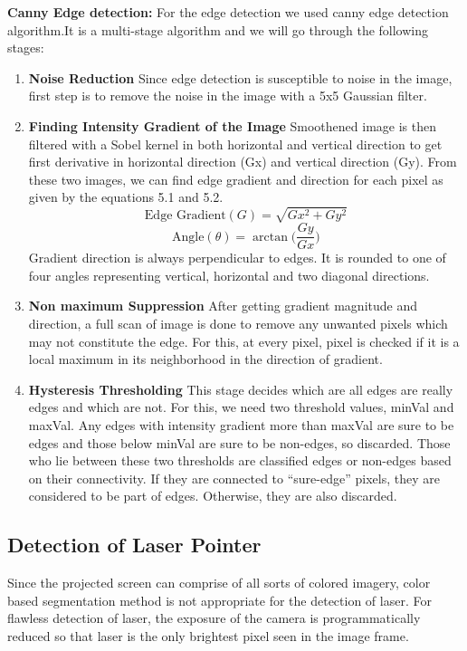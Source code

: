 \documentclass[12pt, a4paper]{article}
\begin{document}
\textbf{Canny Edge detection:}
For the edge detection we used canny edge detection algorithm.It is a multi-stage algorithm and we will go through the following stages:
\begin{enumerate}
\item \textbf {Noise Reduction}
Since edge detection is susceptible to noise in the image, first step is to remove the noise in the image with a 5x5 Gaussian filter.

\item \textbf{Finding Intensity Gradient of the Image}
Smoothened image is then filtered with a Sobel kernel in both horizontal and vertical direction to get first derivative in horizontal direction (Gx) and vertical direction (Gy). From these two images, we can find edge gradient and direction for each pixel as given by the equations 5.1 and 5.2.
\begin{equation}
\text{Edge Gradient}(G) = \sqrt{Gx^2 + Gy^2}
\end{equation}
\begin{equation}
\text{Angle}(\theta) = \arctan\bigg(\frac{Gy}{Gx}\bigg)
\end{equation}
Gradient direction is always perpendicular to edges. It is rounded to one of four angles   representing vertical, horizontal and two diagonal directions.
\item \textbf{Non maximum Suppression}
After getting gradient magnitude and direction, a full scan of image is done to remove any unwanted pixels which may not constitute the edge. For this, at every pixel, pixel is checked ­if it is a local maximum in its neighborhood in the direction of gradient.

\item \textbf{Hysteresis Thresholding}
This stage decides which are all edges are really edges and which are not. For this, we need two threshold values, minVal and maxVal. Any edges with intensity gradient more than maxVal are sure to be edges and those below minVal are sure to be non-edges, so discarded. Those who lie between these two thresholds are classified edges or non-edges based on their connectivity. If they are connected to “sure-edge” pixels, they are considered to be part of edges. Otherwise, they are also discarded.
\end{enumerate}
	
\subsection{Detection of Laser Pointer}
	Since the projected screen can comprise of all sorts of colored imagery, color based segmentation method is not appropriate for the detection of laser. For flawless detection of laser, the exposure of the camera is programmatically reduced so that laser is the only brightest pixel seen in the image frame. 
\end{document}
